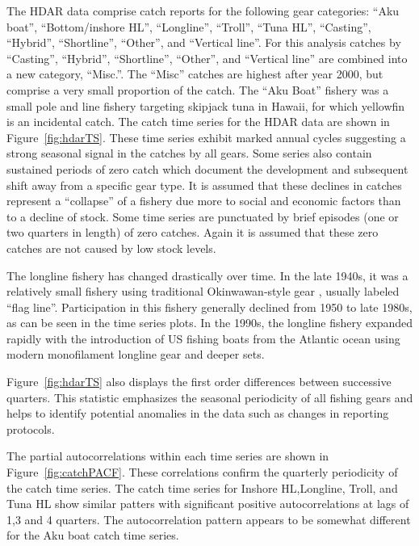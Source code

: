 \documentclass[12pt,letterpaper]{article}
\newcommand\help[1]{\color{Magenta}{\it #1 }\normalcolor}
\begin{document}
The HDAR data comprise catch reports for the following gear
categories:
``Aku boat'', ``Bottom/inshore HL'', ``Longline'',  ``Troll'', ``Tuna
HL'', ``Casting'', ``Hybrid'',  ``Shortline'', ``Other'', and
``Vertical line''.
For this analysis catches by ``Casting'', ``Hybrid'',
``Shortline'', ``Other'', and ``Vertical line'' are combined into a new
category, ``Misc.''. The ``Misc''
catches are highest after year 2000,
but comprise a very small proportion of the catch.
The ``Aku Boat'' fishery was a small pole and line fishery
targeting skipjack tuna in Hawaii, for which yellowfin is an
incidental catch. 
The catch time series for the HDAR data are shown in
Figure~\ref{fig:hdarTS}. These time
series exhibit marked annual cycles suggesting a strong seasonal
signal in the catches by all gears.
Some series also contain sustained periods of zero catch which
document the development and subsequent shift away from a specific
gear type. It is assumed that these declines in catches represent a
``collapse'' of a fishery due more to social and economic factors than
to a decline of stock.
Some time series are punctuated by brief episodes (one or two quarters in
length) of zero catches. Again it is assumed that these zero catches
are not caused by low stock levels.

The longline fishery has changed drastically over time. In the late
1940s, it was a relatively small fishery using traditional
Okinwawan-style gear \help{(reference)}, usually labeled ``flag
line''. Participation in this fishery generally declined from 1950 to
late 1980s, as can be seen in the time series plots. In the 1990s, the longline
fishery expanded rapidly with the introduction of US fishing boats
from the Atlantic ocean using modern monofilament longline gear and
deeper sets.

Figure~\ref{fig:hdarTS} also displays the first order differences
between successive quarters. This statistic emphasizes the seasonal
periodicity of all fishing gears and helps to identify potential anomalies in
the data such as changes in reporting protocols. 

The partial autocorrelations within each time
series are shown in Figure~\ref{fig:catchPACF}. These correlations
confirm the quarterly periodicity  of the catch time series.
The catch time series for Inshore HL,Longline, Troll, and Tuna HL show
similar patters with
significant positive autocorrelations at lags of 1,3 and 4 quarters.
The autocorrelation pattern appears to be somewhat different for the Aku
boat catch time series.
\end{document}
